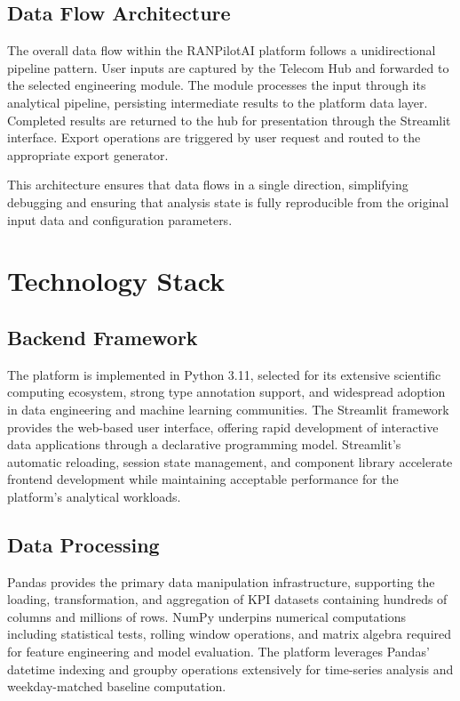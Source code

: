 \subsection{Data Flow Architecture}

The overall data flow within the RANPilotAI platform follows a unidirectional pipeline pattern. User inputs are captured by the Telecom Hub and forwarded to the selected engineering module. The module processes the input through its analytical pipeline, persisting intermediate results to the platform data layer. Completed results are returned to the hub for presentation through the Streamlit interface. Export operations are triggered by user request and routed to the appropriate export generator.

This architecture ensures that data flows in a single direction, simplifying debugging and ensuring that analysis state is fully reproducible from the original input data and configuration parameters.

\section{Technology Stack}

\subsection{Backend Framework}

The platform is implemented in Python 3.11, selected for its extensive scientific computing ecosystem, strong type annotation support, and widespread adoption in data engineering and machine learning communities. The Streamlit framework provides the web-based user interface, offering rapid development of interactive data applications through a declarative programming model. Streamlit's automatic reloading, session state management, and component library accelerate frontend development while maintaining acceptable performance for the platform's analytical workloads.

\subsection{Data Processing}

Pandas provides the primary data manipulation infrastructure, supporting the loading, transformation, and aggregation of KPI datasets containing hundreds of columns and millions of rows. NumPy underpins numerical computations including statistical tests, rolling window operations, and matrix algebra required for feature engineering and model evaluation. The platform leverages Pandas' datetime indexing and groupby operations extensively for time-series analysis and weekday-matched baseline computation.

